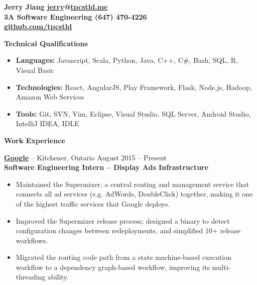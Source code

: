 \documentclass{letter}
\begin{document}
  \thispagestyle{empty}


{\bfseries
  {\Large Jerry Jiang} \hfill \href{mailto:jerry@tpcstld.me}{\uline{jerry}}@\href{//tpcstld.me}{\uline{tpcstld.me}} \\
  3A Software Engineering \hfill (647) 470-4226 \\
\null \hfill \href{https://github.com/tpcstld}{\uline{github.com/tpcstld}}} \\
\null \hrulefill

{\bfseries \Large Technical Qualifications}
\vspace{-3mm}
\begin{itemize}
    \item {\bfseries Languages:}
        Javascript, Scala, Python, Java, C++, C\#, Bash, SQL, R, Visual Basic
    \item {\bfseries Technologies:}
        React, AngularJS, Play Framework, Flask, Node.js, Hadoop, Amazon Web Services
    \item {\bfseries Tools:}
        Git, SVN, Vim, Eclipse, Visual Studio, SQL Server, Android Studio, IntelliJ IDEA, IDLE
\end{itemize}

{\bfseries \Large Work Experience}

\vspace{-1.5mm}
{\bfseries \href{https://www.google.com}{\uline{Google}}} -- Kitchener, Ontario \hfill August 2015 -- Present \\
{\bfseries Software Engineering Intern -- Display Ads Infrastructure}
\vspace{-3mm}
\begin{itemize}
    \item Maintained the Supermixer, a central routing and management service
      that connects all ad services (e.g. AdWords, DoubleClick) together, making
      it one of the highest traffic services that Google deploys.
    \item Improved the Supermixer release process; designed a binary to detect
      configuration changes between redeployments, and simplified 10+
      release workflows.
    \item Migrated the routing code path from a state machine-based execution
        workflow to a dependency graph-based workflow, improving its
        multi-threading ability.
\end{itemize}
\end{document}
